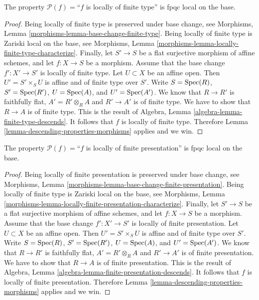 \begin{lemma}
\label{lemma-descending-property-locally-finite-type}
The property $\mathcal{P}(f) =$``$f$ is locally of finite type''
is fpqc local on the base.
\end{lemma}

\begin{proof}
Being locally of finite type is preserved under base change, see
Morphisms, Lemma \ref{morphisms-lemma-base-change-finite-type}.
Being locally of finite type is Zariski local on the base, see
Morphisms, Lemma \ref{morphisms-lemma-locally-finite-type-characterize}.
Finally, let
$S' \to S$ be a flat surjective morphism of affine schemes,
and let $f : X \to S$ be a morphism. Assume that the base change
$f' : X' \to S'$ is locally of finite type.
Let $U \subset X$ be an affine open. Then $U' = S' \times_S U$
is affine and of finite type over $S'$. Write
$S = \mathop{\rm Spec}(R)$,
$S' = \mathop{\rm Spec}(R')$,
$U = \mathop{\rm Spec}(A)$, and
$U' = \mathop{\rm Spec}(A')$.
We know that $R \to R'$ is faithfully flat,
$A' = R' \otimes_R A$ and $R' \to A'$ is of finite type.
We have to show that $R \to A$ is of finite type.
This is the result of
Algebra, Lemma \ref{algebra-lemma-finite-type-descends}.
It follows that $f$ is locally of finite type.
Therefore Lemma \ref{lemma-descending-properties-morphisms} applies and we win.
\end{proof}

\begin{lemma}
\label{lemma-descending-property-locally-finite-presentation}
The property $\mathcal{P}(f) =$``$f$ is locally of finite presentation''
is fpqc local on the base.
\end{lemma}

\begin{proof}
Being locally of finite presentation is preserved under base change, see
Morphisms, Lemma \ref{morphisms-lemma-base-change-finite-presentation}.
Being locally of finite type is Zariski local on the base, see Morphisms,
Lemma \ref{morphisms-lemma-locally-finite-presentation-characterize}.
Finally, let
$S' \to S$ be a flat surjective morphism of affine schemes,
and let $f : X \to S$ be a morphism. Assume that the base change
$f' : X' \to S'$ is locally of finite presentation.
Let $U \subset X$ be an affine open. Then $U' = S' \times_S U$
is affine and of finite type over $S'$. Write
$S = \mathop{\rm Spec}(R)$,
$S' = \mathop{\rm Spec}(R')$,
$U = \mathop{\rm Spec}(A)$, and
$U' = \mathop{\rm Spec}(A')$.
We know that $R \to R'$ is faithfully flat,
$A' = R' \otimes_R A$ and $R' \to A'$ is of finite presentation.
We have to show that $R \to A$ is of finite presentation.
This is the result of
Algebra, Lemma \ref{algebra-lemma-finite-presentation-descends}.
It follows that $f$ is locally of finite presentation.
Therefore Lemma \ref{lemma-descending-properties-morphisms} applies and we win.
\end{proof}


